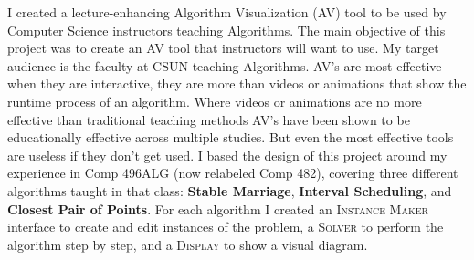 I created a lecture-enhancing Algorithm Visualization (AV) tool 
to be used by Computer Science instructors teaching Algorithms.
The main objective of this project was 
to create an AV tool that instructors will want to use. 
My target audience is the faculty at CSUN teaching Algorithms. 
\newline\newline
AV's are most effective when they are interactive, they are more than videos or animations
that show the runtime process of an algorithm.
Where videos or animations are no more effective than traditional teaching methods 
AV's have been shown to be educationally effective across multiple studies. 
But even the most effective tools are useless if they don't get used. 
\newline\newline
I based the design of this project around my experience 
in Comp 496ALG (now relabeled Comp 482),
covering three different algorithms taught in that class: \textbf{Stable Marriage}, 
\textbf{Interval Scheduling}, and \textbf{Closest Pair of Points}. 
For each algorithm I created 
an \textsc{Instance Maker} interface to create and edit instances of the problem, 
a \textsc{Solver} to perform the algorithm step by step,
and a \textsc{Display} to show a visual diagram.
